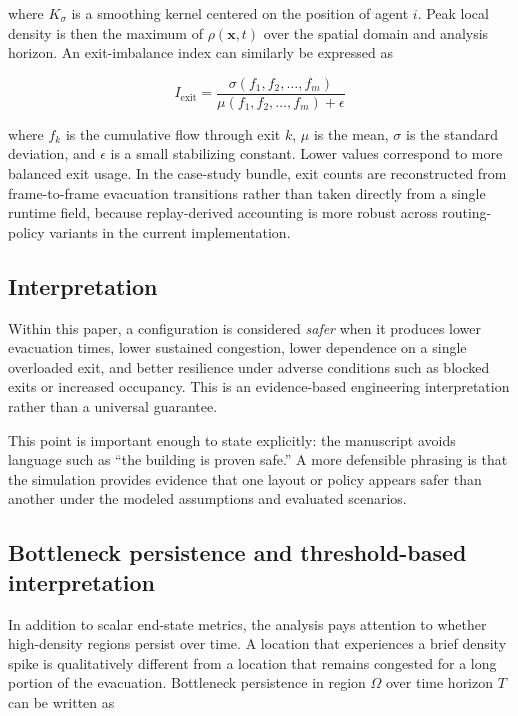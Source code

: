 \documentclass[conference]{IEEEtran}
\begin{document}
where $K_{\sigma}$ is a smoothing kernel centered on the position of agent $i$. Peak local density is then the maximum of $\rho(\mathbf{x},t)$ over the spatial domain and analysis horizon. An exit-imbalance index can similarly be expressed as

\begin{equation}
I_{\text{exit}} = \frac{\sigma(f_1, f_2, \dots, f_m)}{\mu(f_1, f_2, \dots, f_m) + \epsilon}
\label{eq:imbalance}
\end{equation}

where $f_k$ is the cumulative flow through exit $k$, $\mu$ is the mean, $\sigma$ is the standard deviation, and $\epsilon$ is a small stabilizing constant. Lower values correspond to more balanced exit usage. In the case-study bundle, exit counts are reconstructed from frame-to-frame evacuation transitions rather than taken directly from a single runtime field, because replay-derived accounting is more robust across routing-policy variants in the current implementation.

\subsection{Interpretation}
Within this paper, a configuration is considered \emph{safer} when it produces lower evacuation times, lower sustained congestion, lower dependence on a single overloaded exit, and better resilience under adverse conditions such as blocked exits or increased occupancy. This is an evidence-based engineering interpretation rather than a universal guarantee.

This point is important enough to state explicitly: the manuscript avoids language such as ``the building is proven safe.'' A more defensible phrasing is that the simulation provides evidence that one layout or policy appears safer than another under the modeled assumptions and evaluated scenarios.

\subsection{Bottleneck persistence and threshold-based interpretation}

In addition to scalar end-state metrics, the analysis pays attention to whether high-density regions persist over time. A location that experiences a brief density spike is qualitatively different from a location that remains congested for a long portion of the evacuation. Bottleneck persistence in region $\Omega$ over time horizon $T$ can be written as
\end{document}
